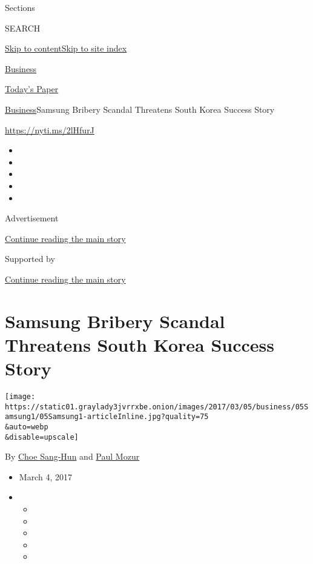 Sections

SEARCH

\protect\hyperlink{site-content}{Skip to
content}\protect\hyperlink{site-index}{Skip to site index}

\href{https://www.nytimes3xbfgragh.onion/section/business}{Business}

\href{https://myaccount.nytimes3xbfgragh.onion/auth/login?response_type=cookie\&client_id=vi}{}

\href{https://www.nytimes3xbfgragh.onion/section/todayspaper}{Today's
Paper}

\href{/section/business}{Business}\textbar{}Samsung Bribery Scandal
Threatens South Korea Success Story

\url{https://nyti.ms/2lHfurJ}

\begin{itemize}
\item
\item
\item
\item
\item
\end{itemize}

Advertisement

\protect\hyperlink{after-top}{Continue reading the main story}

Supported by

\protect\hyperlink{after-sponsor}{Continue reading the main story}

\hypertarget{samsung-bribery-scandal-threatens-south-korea-success-story}{%
\section{Samsung Bribery Scandal Threatens South Korea Success
Story}\label{samsung-bribery-scandal-threatens-south-korea-success-story}}

\texttt{[image: https://static01.graylady3jvrrxbe.onion/images/2017/03/05/business/05Samsung1/05Samsung1-articleInline.jpg?quality=75\\\&auto=webp\\\&disable=upscale]}

By \href{http://www.nytimes3xbfgragh.onion/by/choe-sang-hun}{Choe
Sang-Hun} and
\href{https://www.nytimes3xbfgragh.onion/by/paul-mozur}{Paul Mozur}

\begin{itemize}
\item
  March 4, 2017
\item
  \begin{itemize}
  \item
  \item
  \item
  \item
  \item
  \end{itemize}
\end{itemize}

